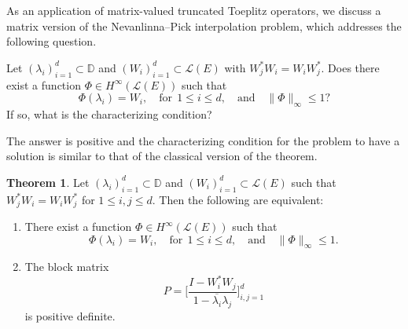 \documentclass{amsart}
\theoremstyle{definition}
\newtheorem{thm}{Theorem}[section]
\newcommand{\oL }{\mathcal{L}(E) }
\begin{document}
As an application of matrix-valued truncated Toeplitz operators, we discuss a matrix version of the Nevanlinna–Pick interpolation problem, which  addresses the following question.

    Let $(\lambda_i)^{d}_{i=1}\subset \mathbb{D}$ and $(W_i)_{i=1}^d\subset \oL$ with $W_j^{*}W_i=W_iW_j^{*}$. Does there exist a function $\Phi\in H^\infty(\oL)$ such that
    \begin{equation}
        \Phi(\lambda_i)=W_i, \quad \text{for}~~ 1\leq i\leq d, \quad \text{and} \quad \|\Phi\|_\infty\leq 1?\nonumber
    \end{equation}
If so, what is the characterizing condition? 

The answer is positive and the characterizing condition for the problem to have a solution is similar to that of the classical version of the theorem. 

\begin{thm}\label{NevPick}
     Let $(\lambda_i)^{d}_{i=1}\subset \mathbb{D}$ and $(W_i)_{i=1}^d\subset \oL$ such that $W_j^{*}W_i=W_iW_j^{*}$ for $1\leq i,j\leq d$. Then the following are equivalent:
     \begin{enumerate}
         \item There exist a function $\Phi\in H^\infty(\oL)$ such that \begin{equation*}
        \Phi(\lambda_i)=W_i, \quad \text{for}~~ 1\leq i\leq d, \quad \text{and} \quad \|\Phi\|_\infty\leq 1.\label{i}
    \end{equation*}
    \item The block matrix
    $$P=\Big[\frac{I-W^*_iW_j}{1-\overline{\lambda_i}\lambda_j}\Big]_{i,j=1}^{d}$$ is positive definite. \label{ii}
    \end{enumerate}
\end{thm}
\end{document}
